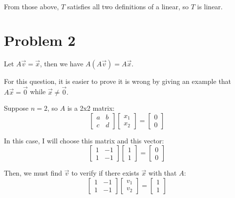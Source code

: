 \documentclass[10pt]{article}
\begin{document}
\noindent From those above, $T$ satisfies all two definitions of a linear, so $T$ is linear.

\section*{Problem 2}

\noindent Let $A\Vec{v} = \Vec{x}$, then we have $A(A\Vec{v}) = A\Vec{x}$.\par

\noindent For this question, it is easier to prove it is wrong by giving an example that $A\Vec{x} = \Vec{0}$ while $\Vec{x}\neq \Vec{0}.$

\noindent Suppose $n = 2$, so $A$ is a 2x2 matrix:
\begin{equation*}
    \begin{bmatrix}
        a & b \\
        c & d
    \end{bmatrix}
    \begin{bmatrix}
        x_1 \\
        x_2
    \end{bmatrix}
    =
    \begin{bmatrix}
        0 \\
        0
    \end{bmatrix}
\end{equation*}
\par

\noindent In this case, I will choose this matrix and this vector:
\begin{equation*}
    \begin{bmatrix}
        1 & -1 \\
        1 & -1
    \end{bmatrix}
    \begin{bmatrix}
        1 \\
        1
    \end{bmatrix}
    =
    \begin{bmatrix}
        0 \\
        0
    \end{bmatrix}
\end{equation*}

\noindent Then, we must find $\Vec{v}$ to verify if there exists $\Vec{x}$ with that $A$:
\begin{equation*}
    \begin{bmatrix}
        1 & -1 \\
        1 & -1
    \end{bmatrix}
    \begin{bmatrix}
        v_1 \\
        v_2
    \end{bmatrix}
    =
    \begin{bmatrix}
        1 \\
        1
    \end{bmatrix}
\end{equation*}
\end{document}
